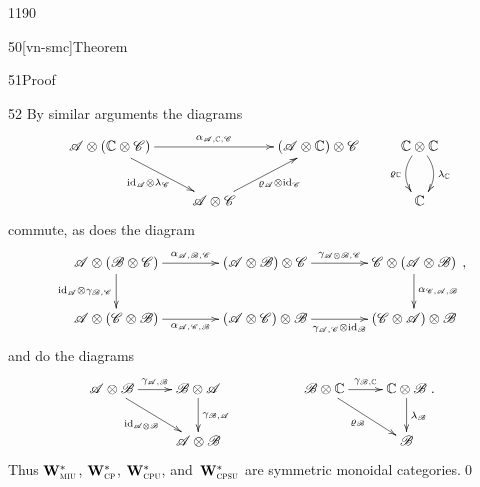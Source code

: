 \begin{parsec}{1190}
\begin{point}{50}[vn-smc]{Theorem}
\begin{point}{51}{Proof}
\begin{point}{52}
By similar arguments the diagrams
\begin{equation*}
\xymatrix{
    \scrA\otimes(\C\otimes \scrC)
    \ar[rr]^{\alpha_{\scrA,\C,\scrC}}
    \ar[rd]_{\id_\scrA\otimes \lambda_\scrC}
    &
    &
    (\scrA\otimes \C)\otimes \scrC
    &
    \C\otimes \C 
    \ar@/_1em/[d]_{\varrho_\C}
    \ar@/^1em/[d]^{\lambda_\C}
    \\
    &
    \scrA\otimes \scrC
    \ar[ru]_{\varrho_\scrA\otimes \id_\scrC}
    &
    &
    \C
}
\end{equation*}
commute, as does the diagram
\begin{equation*}
\xymatrix@C=4em{
    \scrA\otimes(\scrB\otimes \scrC)
    \ar[r]^{\alpha_{\scrA,\scrB,\scrC}}
    \ar[d]_{\id_\scrA\otimes\gamma_{\scrB,\scrC}}
    &
    (\scrA\otimes\scrB)\otimes\scrC
    \ar[r]^{\gamma_{\scrA\otimes\scrB,\scrC}}
    &
    \scrC\otimes(\scrA\otimes\scrB)
    \ar[d]^{\alpha_{\scrC,\scrA,\scrB}}
    \\
    \scrA\otimes(\scrC\otimes \scrB)
    \ar[r]_{\alpha_{\scrA,\scrC,\scrB}}
    &
    (\scrA\otimes \scrC)\otimes \scrB
    \ar[r]_{\gamma_{\scrA,\scrC}\otimes \id_\scrB}
    &
    (\scrC\otimes \scrA)\otimes \scrB
},
\end{equation*}
and do the diagrams
\begin{equation*}
\xymatrix{
\scrA\otimes\scrB
    \ar[r]^{\gamma_{\scrA,\scrB}}
    \ar[rd]_{\id_{\scrA\otimes \scrB}}
&
\scrB\otimes \scrA
    \ar[d]^{\gamma_{\scrB,\scrA}}
&
    &
\scrB\otimes\C
    \ar[r]^{\gamma_{\scrB,\C}}
    \ar[rd]_{\varrho_{\scrB}}
&
\C\otimes \scrB
    \ar[d]^{\lambda_\scrB}
\\
&
\scrA\otimes \scrB
&
    &
&
\scrB
}.
\end{equation*}
Thus $\mathbf{W}^*_{\text{\textsc{miu}}}$, $\mathbf{W}^*_{\text{\textsc{cp}}}$, $\mathbf{W}^*_{\text{\textsc{cpu}}}$,
and~$\mathbf{W}^*_{\text{\textsc{cpsu}}}$ are symmetric monoidal categories.\qed
\end{point}
\end{point}
\end{point}
\end{parsec}
